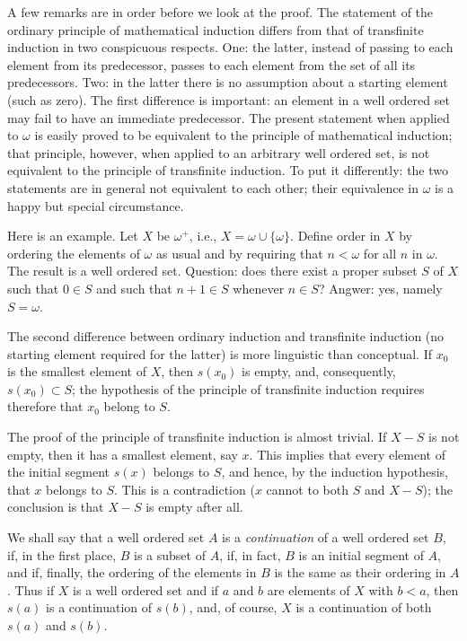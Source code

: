 A few remarks are in order before we look at the proof. The statement of the ordinary principle of mathematical induction differs from that of transfinite induction in two conspicuous respects. One: the latter, instead of passing to each element from its predecessor, passes to each element from the set of all its predecessors. Two: in the latter there is no assumption about a starting element (such as zero). The first difference is important: an element in a well ordered set may fail to have an immediate predecessor. The present statement when applied to $\omega$ is easily proved to be equivalent to the principle of mathematical induction; that principle, however, when applied to an arbitrary well ordered set, is not equivalent to the principle of transfinite induction. To put it differently: the two statements are in general not equivalent to each other; their equivalence in $\omega$ is a happy but special circumstance. 

Here is an example. Let $X$ be $\omega^{+}$, i.e., $X = \omega \cup \{ \omega \}$. Define order in $X$ by ordering the elements of $\omega$ as usual and by requiring that $n < \omega$ for all $n$ in $\omega$. The result is a well ordered set. Question: does there exist a proper subset $S$ of $X$ such that $0 \in S$ and such that $n + 1 \in  S$ whenever $n \in S$? Angwer: yes, namely $S = \omega$. 

The second difference between ordinary induction and transfinite induction (no starting element required for the latter) is more linguistic than conceptual. If $x_{0}$ is the smallest element of $X$, then $s(x_{0})$ is empty, and, consequently, $s(x_{0}) \subset S$; the hypothesis of the principle of transfinite induction requires therefore that $x_{0}$ belong to $S$.

The proof of the principle of transfinite induction is almost trivial. If $X - S$ is not empty, then it has a smallest element, say $x$. This implies that every element of the initial segment $s(x)$ belongs to $S$, and hence, by the induction hypothesis, that $x$ belongs to $S$. This is a contradiction ($x$ cannot to both $S$ and $X - S$); the conclusion is that $X - S$ is empty after all. 

We shall say that a well ordered set $A$ is a \textit{continuation} of a well ordered set $B$, if, in the first place, $B$ is a subset of $A$, if, in fact, $B$ is an initial segment of $A$, and if, finally, the ordering of the elements in $B$ is the same as their ordering in $A$. Thus if $X$ is a well ordered set and if $a$ and $b$ are elements of $X$ with $b < a$, then $s(a)$ is a continuation of $s(b)$, and, of course, $X$ is a continuation of both $s(a)$ and $s(b)$. 

